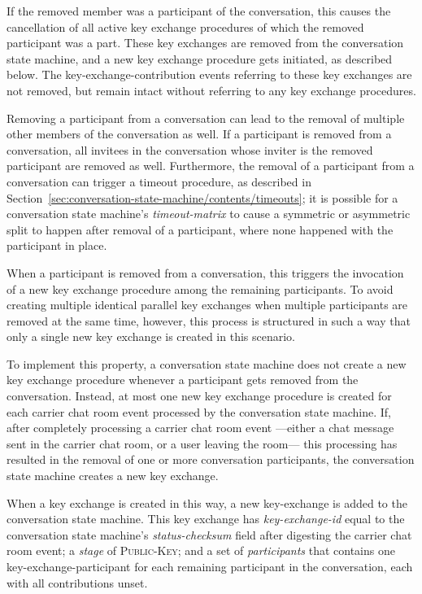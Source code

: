 \documentclass{article}
\def\smfield#1{\textsl{#1}}
\def\type#1{\textsf{#1}}
\begin{document}
If the removed member was a participant of the conversation, this causes the cancellation of all active key exchange procedures of which the removed participant was a part.
These key exchanges are removed from the conversation state machine, and a new key exchange procedure gets initiated, as described below.
The \type{key-exchange-contribution} events referring to these key exchanges are not removed, but remain intact without referring to any key exchange procedures.

Removing a participant from a conversation can lead to the removal of multiple other members of the conversation as well.
If a participant is removed from a conversation, all invitees in the conversation whose inviter is the removed participant are removed as well.
Furthermore, the removal of a participant from a conversation can trigger a timeout procedure, as described in Section~\ref{sec:conversation-state-machine/contents/timeouts}; it is possible for a conversation state machine's \smfield{timeout-matrix} to cause a symmetric or asymmetric split to happen after removal of a participant, where none happened with the participant in place.

When a participant is removed from a conversation, this triggers the invocation of a new key exchange procedure among the remaining participants.
To avoid creating multiple identical parallel key exchanges when multiple participants are removed at the same time, however, this process is structured in such a way that only a single new key exchange is created in this scenario.

To implement this property, a conversation state machine does not create a new key exchange procedure whenever a participant gets removed from the conversation.
Instead, at most one new key exchange procedure is created for each carrier chat room event processed by the conversation state machine.
If, after completely processing a carrier chat room event ---either a chat message sent in the carrier chat room, or a user leaving the room--- this processing has resulted in the removal of one or more conversation participants, the conversation state machine creates a new key exchange.

When a key exchange is created in this way, a new \type{key-exchange} is added to the conversation state machine.
This key exchange has \smfield{key-exchange-id} equal to the conversation state machine's \smfield{status-checksum} field after digesting the carrier chat room event; a \smfield{stage} of \textsc{Public-Key}; and a set of \smfield{participants} that contains one \type{key-exchange-participant} for each remaining participant in the conversation, each with all contributions unset.
\end{document}
